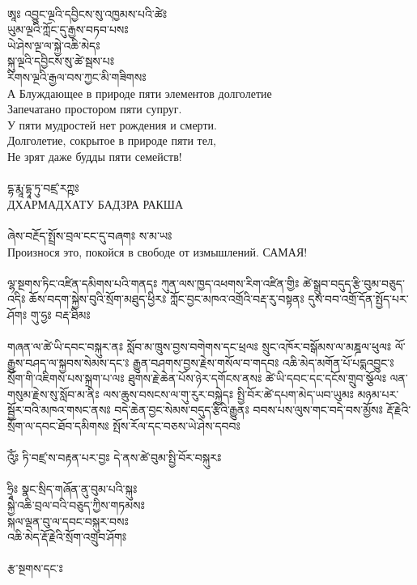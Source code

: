 \\
{\ti ཨཱཿ འབྱུང་ལྔའི་དབྱིངས་སུ་འཁྱམས་པའི་ཚེཿ \\
ཡུམ་ལྔའི་ཀློང་དུ་རྒྱས་བཏབ་པསཿ \\
ཡེ་ཤེས་ལྔ་ལ་སྐྱེ་འཆི་མེདཿ \\
སྐུ་ལྔའི་དབྱིངས་སུ་ཚེ་སྦས་པཿ \\
རིགས་ལྔའི་རྒྱལ་བས་ཀྱང་མི་གཟིགསཿ }\\
А  Блуждающее в природе пяти элементов долголетие\\
Запечатано простором пяти супруг.\\
У пяти мудростей нет рождения и смерти.\\
Долголетие, сокрытое в природе пяти тел,\\
Не зрят даже будды пяти семейств!\\
\\
{\ti དྷ་རྨཱ་དྷཱ་ཏུ་བཛྲ་རཀྵཿ}\\
ДХАРМАДХАТУ БАДЗРА РАКША\\
\\
{\ti ཞེས་བརྔོད་སྤྲོས་བྲལ་ངང་དུ་བཞགཿ ས་མ་ཡཿ }\\
Произнося это, покойся в свободе от измышлений. САМАЯ! \\
\\
{\ti ལྷ་སྔགས་ཏིང་འཛིན་དམིགས་པའི་གནདཿ ཀུན་ལས་ཁྱད་འཕགས་རིག་འཛིན་གྱིཿ ཚེ་སྒྲུབ་བདུད་རྩི་བུམ་བཅུད་འདིཿ ཆོས་བདག་སྐྱེས་བུའི་སྲོག་མཐུད་ཕྱིརཿ ཀློང་བྱང་མཁའ་འགྲོའི་བརྡ་རུ་བསྟནཿ དུས་བབ་འགྲོ་དོན་སྤྱོད་པར་ཤོགཿ གུ་ཧྱཿ  བརྡ་ཐིམཿ \\
\\
གཞན་ལ་ཚེ་ཡི་དབང་བསྐུར་ནཿ སློབ་མ་ཁྲུས་བྱས་བགེགས་དང་ཕྲལཿ སྲུང་འཁོར་བསྒོམས་ལ་མཎྜལ་ཕུལཿ ལོ་རྒྱུས་བཤད་ལ་སྐྱབས་སེམས་དང་ཿ རྒྱུན་བཤགས་བྱས་རྗེས་གསོལ་བ་གདབཿ འཆི་མེད་མགོན་པོ་པདྨའབྱུང་ཿ སྲོག་གི་འཇིགས་པས་སྐྲག་པ་ལཿ ཐུགས་རྗེ་ཆེན་པོས་ཉེར་དགོངས་ནསཿ ཚེ་ཡི་དབང་དང་དངོས་གྲུབ་སྩོལཿ ལན་གསུམ་རྗེས་སུ་སློབ་མ་ནིཿ ལས་ཆུས་བསངས་ལ་གུ་རུར་བསྐྱེདཿ སྤྱི་བོར་ཚེ་དཔག་མེད་ཡབ་ཡུམཿ མཉམ་པར་སྦྱོར་བའི་མཁའ་གསང་ནསཿ བདེ་ཆེན་བྱང་སེམས་བདུད་རྩིའི་རྒྱུནཿ བབས་པས་ལུས་གང་བདེ་བས་མྱོསཿ རྡོ་རྗེའི་སྲོག་ལ་དབང་ཐོབ་དམིགསཿ སྤོས་རོལ་དང་བཅས་ཡེ་ཤེས་དབབཿ \\
\\
འོུཾཿ   ཏི་བཛྲ་ས་བརྟན་པར་བྱཿ དེ་ནས་ཚེ་བུམ་སྤྱི་བོར་བསྐུརཿ\\
\\
ཧྲཱིཿ སྣང་སྲིད་གཞོན་ནུ་བུམ་པའི་སྐུཿ \\
སྐྱེ་འཆི་བྲལ་བའི་བཅུད་ཀྱིས་གཏམསཿ \\
སྐལ་ལྡན་བུ་ལ་དབང་བསྐུར་བསཿ \\
འཆི་མེད་རྡོ་རྗེའི་སྲོག་འགྲུབ་ཤོགཿ \\
\\
རྩ་སྔགས་དང་ཿ \\}
